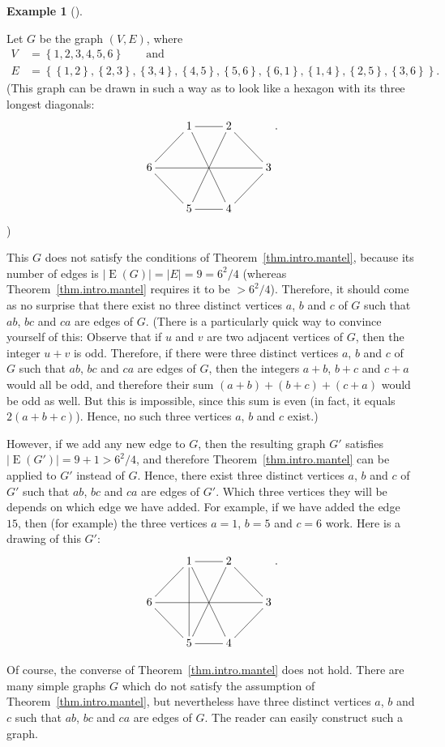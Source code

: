 \documentclass[numbers=enddot,12pt,final,onecolumn,notitlepage]{scrartcl}%
\makeatletter
\theoremstyle{definition}
\newtheorem{exam}[theo]{Example}
\newenvironment{example}[1][]
{\begin{exam}[#1]\begin{leftbar}}
{\end{leftbar}\end{exam}}
\newcommand{\set}[1]{\left\{ #1 \right\}}
\newcommand{\abs}[1]{\left| #1 \right|}
\newcommand{\tup}[1]{\left( #1 \right)}
\newcommand{\edges}[1]{\operatorname{E}\left( #1 \right)}
\newcommand{\are}{\ar@{-}}
\makeatother
\begin{document}
\begin{example}
Let $G$ be the graph $\tup{V, E}$, where
\begin{align*}
V &= \set{1, 2, 3, 4, 5, 6} \qquad \text{and} \\
E &= \set{\set{1,2}, \set{2,3}, \set{3,4}, \set{4,5}, \set{5,6},
          \set{6,1}, \set{1,4}, \set{2,5}, \set{3,6}} .
\end{align*}
(This graph can be drawn in such a way as to look like a hexagon with
its three longest diagonals:
\begin{align*}
\xymatrix{
& 1 \are[r] \are[rdd] & 2 \are[rd] \are[ldd] \\
6 \are[ru] \are[rrr] & & & 3 \are[ld] \\
& 5 \are[lu] & 4 \are[l]
} .
\end{align*}
)

This $G$ does not satisfy the conditions of
Theorem~\ref{thm.intro.mantel}, because its number of edges is
$\abs{\edges{G}} = \abs{E} = 9 = 6^2 / 4$ (whereas
Theorem~\ref{thm.intro.mantel} requires it to be $> 6^2 / 4$).
Therefore, it should come as no surprise that there exist no three
distinct vertices $a$, $b$ and $c$ of $G$ such that $ab$, $bc$ and
$ca$ are edges of $G$. (There is a particularly quick way to convince
yourself of this: Observe that if $u$ and $v$ are two adjacent
vertices of $G$, then the integer $u+v$ is odd. Therefore, if there
were three distinct vertices $a$, $b$ and $c$ of $G$ such that $ab$,
$bc$ and $ca$ are edges of $G$, then the integers $a+b$, $b+c$ and
$c+a$ would all be odd, and therefore their sum
$\tup{a+b} + \tup{b+c} + \tup{c+a}$ would be odd as well. But this
is impossible, since this sum is even (in fact, it equals
$2\tup{a+b+c}$). Hence, no such three vertices $a$, $b$ and $c$
exist.)

However, if we add any new edge to $G$, then the resulting graph $G'$
satisfies $\abs{\edges{G'}} = 9 + 1 > 6^2 / 4$, and therefore
Theorem~\ref{thm.intro.mantel} can be applied to $G'$ instead of $G$.
Hence, there exist three distinct vertices $a$,
$b$ and $c$ of $G'$ such that $ab$, $bc$ and $ca$ are edges of $G'$.
Which three vertices they will be depends on which edge we have
added. For example, if we have added the edge $15$, then (for example)
the three vertices $a = 1$, $b = 5$ and $c = 6$ work. Here is a
drawing of this $G'$:
\begin{align*}
\xymatrix{
& 1 \are[r] \are[rdd] \are[dd] & 2 \are[rd] \are[ldd] \\
6 \are[ru] \are[rrr] & & & 3 \are[ld] \\
& 5 \are[lu] & 4 \are[l]
} .
\end{align*}

Of course, the converse of Theorem~\ref{thm.intro.mantel} does not
hold. There are many simple graphs $G$ which do not satisfy the
assumption of Theorem~\ref{thm.intro.mantel}, but nevertheless have
three distinct vertices $a$, $b$ and $c$
such that $ab$, $bc$ and $ca$ are edges of $G$. The reader can easily
construct such a graph.
\end{example}
\end{document}
